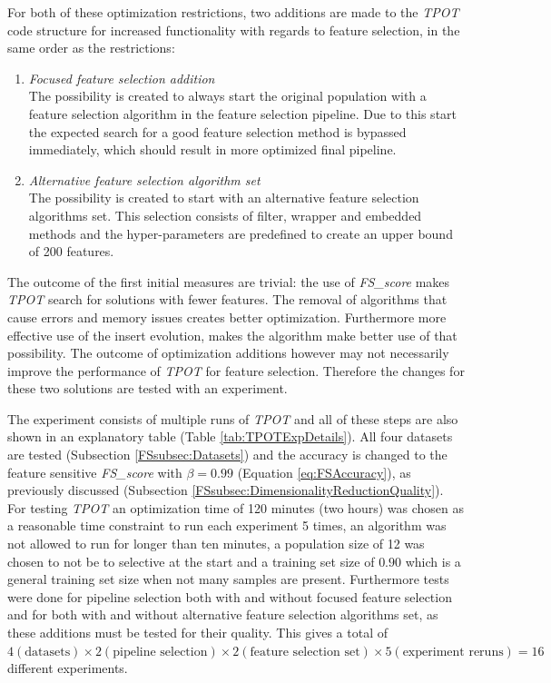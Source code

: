 \documentclass[10pt,a4paper]{report}
\begin{document}
	For both of these optimization restrictions, two additions are made to the \textit{TPOT} code structure for increased functionality with regards to feature selection, in the same order as the restrictions:
	
	\begin{enumerate}
		\item \textit{Focused feature selection addition} \\
		The possibility is created to always start the original population with a feature selection algorithm in the feature selection pipeline. Due to this start the expected search for a good feature selection method is bypassed immediately, which should result in more optimized final pipeline.
		\item \textit{Alternative feature selection algorithm set} \\
		The possibility is created to start with an alternative feature selection algorithms set. This selection consists of filter, wrapper and embedded methods and the hyper-parameters are predefined to create an upper bound of 200 features.
	\end{enumerate}
	
	The outcome of the first initial measures are trivial: the use of \textit{FS\_score} makes \textit{TPOT} search for solutions with fewer features. The removal of algorithms that cause errors and memory issues creates better optimization. Furthermore more effective use of the insert evolution, makes the algorithm make better use of that possibility. The outcome of optimization additions however may not necessarily improve the performance of \textit{TPOT} for feature selection. Therefore the changes for these two solutions are tested with an experiment. 
	
	The experiment consists of multiple runs of \textit{TPOT} and all of these steps are also shown in an explanatory table (Table \ref{tab:TPOTExpDetails}). All four datasets are tested (Subsection \ref{FSsubsec:Datasets}) and the accuracy is changed to the feature sensitive \textit{FS\_score} with $\beta = 0.99$ (Equation \ref{eq:FSAccuracy}), as previously discussed (Subsection \ref{FSsubsec:DimensionalityReductionQuality}). For testing \textit{TPOT} an optimization time of 120 minutes (two hours) was chosen as a reasonable time constraint to run each experiment 5 times, an algorithm was not allowed to run for longer than ten minutes, a population size of 12 was chosen to not be to selective at the start and a training set size of $0.90$ which is a general training set size when not many samples are present. Furthermore tests were done for pipeline selection both with and without focused feature selection  and for both with and without alternative feature selection algorithms set, as these additions must be tested for their quality. This gives a total of $4 (\text{datasets}) \times 2 (\text{pipeline selection}) \times 2 (\text{feature selection set}) \times 5 (\text{experiment reruns}) = 16$ different experiments.
	
\end{document}
